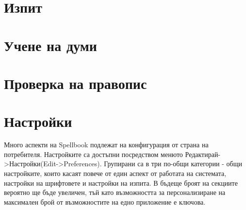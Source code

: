\section{Изпит}
\section{Учене на думи}
\section{Проверка на правопис}
\section{Настройки}
Много аспекти на Spellbook подлежат на конфигурация от страна на
потребителя. Настройките са достъпни посредством менюто
Редактирай->Настройки(Edit->Preferences). Групирани са в три по-общи
категории - общи настройките, които касаят повече от един аспект от
работата на системата, настройки на шрифтовете и настройки на
изпита. В бъдеще броят на секциите вероятно ще бъде увеличен, тъй като
възможността за персонализиране на максимален брой от възможностите на
едно приложение е ключова.
